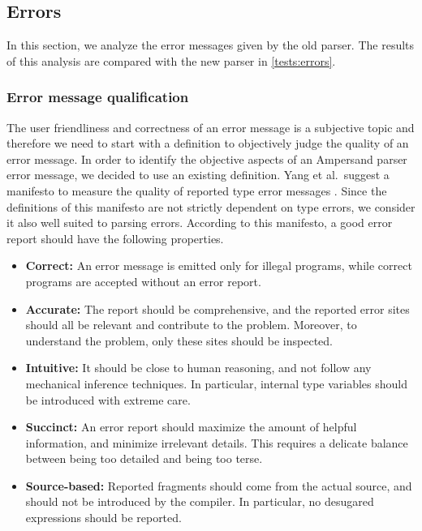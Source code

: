 
\subsection{Errors}
\label{analysis:errors}
In this section, we analyze the error messages given by the old parser.
The results of this analysis are compared with the new parser in \autoref{tests:errors}.

\subsubsection{Error message qualification}
The user friendliness and correctness of an error message is a subjective topic and therefore we need to start with a definition to objectively judge the quality of an error message.
In order to identify the objective aspects of an Ampersand parser error message, we decided to use an existing definition.
Yang et al.~suggest a manifesto to measure the quality of reported type error messages .
Since the definitions of this manifesto are not strictly dependent on type errors, we consider it also well suited to parsing errors.
According to this manifesto, a good error report should have the following properties.
\begin{itemize}
  \item \textbf{Correct:} An error message is emitted only for illegal programs, while correct programs are accepted without an error report.
  \item \textbf{Accurate:} The report should be comprehensive, and the reported error sites should all be relevant and contribute to the problem. Moreover, to understand the problem, only these sites should be inspected.
  \item \textbf{Intuitive:} It should be close to human reasoning, and not follow any mechanical inference techniques. In particular, internal type variables should be introduced with extreme care.
  \item \textbf{Succinct:} An error report should maximize the amount of helpful information, and minimize irrelevant details. This requires a delicate balance between being too detailed and being too terse.
  \item \textbf{Source-based:} Reported fragments should come from the actual source, and should not be introduced by the compiler. In particular, no desugared expressions should be reported.
\end{itemize}

